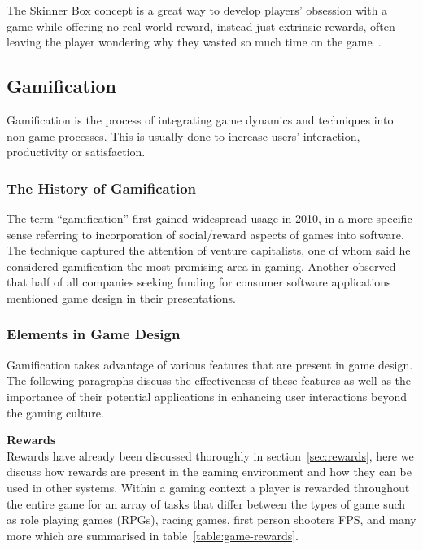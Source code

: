 \documentclass[a4paper,12pt]{article}
\begin{document}
\par
The Skinner Box concept is a great way to develop players’ obsession with a game while offering no real world reward, instead just extrinsic rewards, often leaving the player wondering why they wasted so much time on the game~\citep{fiveCreepyWays,bread-and-games}. 

\subsection{Gamification}\label{sec:gamification}
Gamification is the process of integrating game dynamics and techniques into non-game processes. This is usually done to increase users' interaction, productivity or satisfaction.

\subsubsection{The History of Gamification}
The term ``gamification'' first gained widespread usage in 2010, in a more specific sense referring to incorporation of social/reward aspects of games into software. The technique captured the attention of venture capitalists, one of whom said he considered gamification the most promising area in gaming. Another observed that half of all companies seeking funding for consumer software applications mentioned game design in their presentations.

\subsubsection{Elements in Game Design}
Gamification takes advantage of various features that are present in game design. The following paragraphs discuss the effectiveness of these features as well as the importance of their potential applications in enhancing user interactions beyond the gaming culture. 

\par
\textbf{Rewards}\\
Rewards have already been discussed thoroughly in section~\ref{sec:rewards}, here we discuss how rewards are present in the gaming environment and how they can be used in other systems. 
Within a gaming context a player is rewarded throughout the entire game for an array of tasks that differ between the types of game such as role playing games (RPGs), racing games, first person shooters {FPS}, and many more which are summarised in table~\ref{table:game-rewards}.
\end{document}
